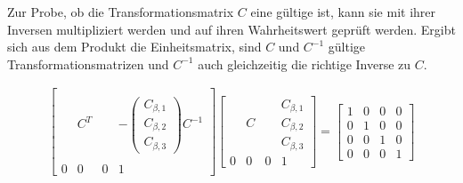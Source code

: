 %

%
Zur Probe, ob die Transformationsmatrix $C$ eine gültige ist, kann sie mit ihrer Inversen multipliziert werden und auf ihren Wahrheitswert geprüft werden. Ergibt sich aus dem Produkt die Einheitsmatrix, sind $C$ und $C^{-1}$ gültige Transformationsmatrizen und $C^{-1}$ auch gleichzeitig die richtige Inverse zu $C$.

\begin{gather}
\begin{bmatrix}
& & & \\
& C^T & & -\begin{pmatrix}
C_{\beta,1}\\
C_{\beta,2}\\
C_{\beta,3}
\end{pmatrix}C^{-1} \\
& & & \\
0&0 &0 & 1
\end{bmatrix}
\begin{bmatrix}
& & & C_{\beta,1}\\
& C & & C_{\beta,2}\\
& & &C_{\beta,3} \\
0&0 &0 & 1
\end{bmatrix}
=
\begin{bmatrix}
1&0 &0 & 0\\
0& 1 &0 & 0\\
0& 0& 1& 0\\
0& 0 &0 & 1
\end{bmatrix}
\end{gather}\\

